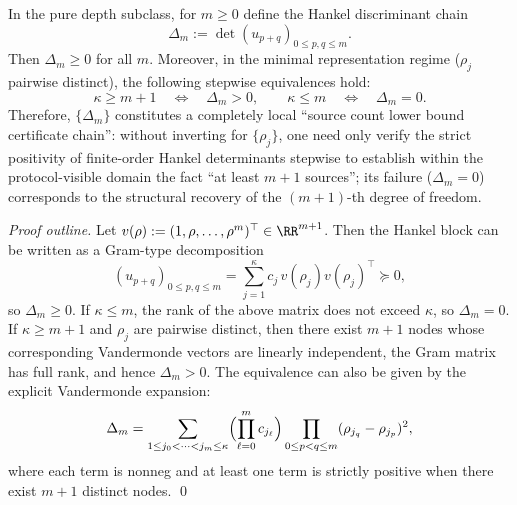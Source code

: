 \begin{proposition}\label{prop:xi-scan-hankel-determinant-chain-kappa}
In the pure depth subclass, for \(m\ge 0\) define the Hankel discriminant chain
\[
\Delta_m:=\det(u_{p+q})_{0\le p,q\le m}.
\]
Then \(\Delta_m\ge 0\) for all \(m\).
Moreover, in the minimal representation regime (\(\rho_j\) pairwise distinct), the following stepwise equivalences hold:
\[
\boxed{\;
\kappa\ge m+1\quad\Longleftrightarrow\quad \Delta_m>0,\qquad
\kappa\le m\quad\Longleftrightarrow\quad \Delta_m=0.\;}
\]
Therefore, \(\{\Delta_m\}\) constitutes a completely local ``source count lower bound certificate chain'': without inverting for \(\{\rho_j\}\), one need only verify the strict positivity of finite-order Hankel determinants stepwise to establish within the protocol-visible domain the fact ``at least \(m+1\) sources''; its failure (\(\Delta_m=0\)) corresponds to the structural recovery of the \((m+1)\)-th degree of freedom.
\end{proposition}
\begin{proof}[Proof outline]
Let \(v(\rho):=(1,\rho,\dots,\rho^{m})^\top\in\RR^{m+1}\).
Then the Hankel block can be written as a Gram-type decomposition
\[
(u_{p+q})_{0\le p,q\le m}
=\sum_{j=1}^{\kappa}c_j\,v(\rho_j)v(\rho_j)^\top\succeq 0,
\]
so \(\Delta_m\ge 0\).
If \(\kappa\le m\), the rank of the above matrix does not exceed \(\kappa\), so \(\Delta_m=0\).
If \(\kappa\ge m+1\) and \(\rho_j\) are pairwise distinct, then there exist \(m+1\) nodes whose corresponding Vandermonde vectors are linearly independent, the Gram matrix has full rank, and hence \(\Delta_m>0\).
The equivalence can also be given by the explicit Vandermonde expansion:
\[
\Delta_m=\sum_{1\le j_0<\cdots<j_m\le \kappa}
\Bigl(\prod_{\ell=0}^{m}c_{j_\ell}\Bigr)
\prod_{0\le p<q\le m}(\rho_{j_q}-\rho_{j_p})^2,
\]
where each term is nonneg and at least one term is strictly positive when there exist \(m+1\) distinct nodes. \qed
\end{proof}

\endinput
